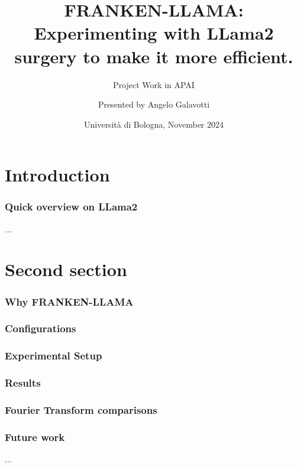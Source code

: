 \documentclass{beamer}
\title[] %
{FRANKEN-LLAMA: Experimenting with LLama2 surgery to make it more efficient.}
\subtitle{Project Work in APAI}
\author[Angelo Galavotti] %
{Presented by Angelo Galavotti}
\date[December 2024] %
{Università di Bologna, November 2024}
\begin{document}
\frame{\titlepage}




\section{Introduction}
\begin{frame}
  \frametitle{Quick overview on LLama2}
  ...
  \end{frame}


\section{Second section}

\begin{frame}
\frametitle{Why FRANKEN-LLAMA}
\end{frame}

\begin{frame}
  \frametitle{Configurations}
  \end{frame}
  

\begin{frame}
  \frametitle{Experimental Setup}
\end{frame}


\begin{frame}
  \frametitle{Results}
\end{frame}


\begin{frame}
  \frametitle{Fourier Transform comparisons}

\end{frame}



\begin{frame}
  \frametitle{Future work}
  ...
\end{frame}

\end{document}
